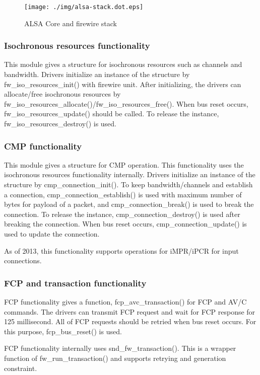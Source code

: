 \documentclass[onecolumn]{article}
\begin{document}
\begin{figure}[htbp]
	\centering
	\texttt{[image: ./img/alsa-stack.dot.eps]}
	\caption{{ALSA Core and firewire stack}}
	\label{alsa_stack}
\end{figure}

\subsubsection{Isochronous resources functionality}

This module gives a structure for isochronous resources such as channels and bandwidth. Drivers initialize an instance of the structure by fw\_iso\_resources\_init() with firewire unit. After initializing, the drivers can allocate/free isochronous resources by fw\_iso\_resources\_allocate()/fw\_iso\_resources\_free(). When bus reset occurs, fw\_iso\_resources\_update() should be called. To release the instance, fw\_iso\_resources\_destroy() is used.

\subsubsection{CMP functionality}

This module gives a structure for CMP operation. This functionality uses the isochronous resources functionality internally. Drivers initialize an instance of the structure by cmp\_connection\_init(). To keep bandwidth/channels and establish a connection, cmp\_connection\_establish() is used with maximum number of bytes for payload of a packet, and cmp\_connection\_break() is used to break the connection. To release the instance, cmp\_connection\_destroy() is used after breaking the connection. When bus reset occurs, cmp\_connection\_update() is used to update the connection.

As of 2013, this functionality supports operations for iMPR/iPCR for input connections.

\subsubsection{FCP and transaction functionality}

FCP functionality gives a function, fcp\_avc\_transaction() for FCP and AV/C commands. The drivers can transmit FCP request and wait for FCP response for 125 millisecond. All of FCP requests should be retried when bus reset occurs. For this purpose, fcp\_bus\_reset() is used.

FCP functionality internally uses snd\_fw\_transaction(). This is a wrapper function of fw\_run\_transaction() and supports retrying and generation constraint.
\end{document}
